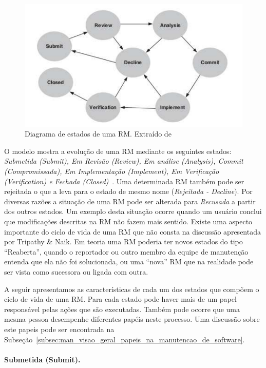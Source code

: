 \begin{figure}[htpb]
	\centering
	\includegraphics[width=0.8\linewidth]{./chapter-manutencao-software-visao-geral/img/diagrama-estado-rm.pdf}
	\caption{Diagrama de estados de uma RM\@. Extraído
		de~\cite{tripathy2014software}}
\label{fig:diagrama-estado-rm}
\end{figure}

O modelo mostra a evolução de uma RM mediante os seguintes estados:
\textit{Submetida (Submit), Em Revisão (Review), Em análise (Analysis), Commit
	(Compromissada), Em Implementação (Implement), Em Verificação (Verification)
	e Fechada (Closed)}~\cite{tripathy2014software}. Uma determinada RM também
pode ser rejeitada o que a leva para o estado de mesmo nome (\textit{Rejeitada -
	Decline}).  Por diversas razões a situação de uma RM pode ser alterada para
\textit{Recusada} a partir dos outros estados. Um exemplo desta situação ocorre
quando um  usuário conclui que modificações descritas na RM não fazem mais
sentido. Existe uma aspecto importante do ciclo de vida de uma RM que não consta
na discussão apresentada por Tripathy \& Naik. Em teoria uma RM poderia ter
novos estados do tipo ``Reaberta'', quando o reportador ou outro membro da
equipe de manutenção entenda que ela não foi solucionada, ou uma ``nova'' RM que
na realidade pode ser vista como sucessora ou ligada com outra.

A seguir apresentamos as características de cada um dos estados que compõem o
ciclo de vida de uma RM\@. Para cada estado pode haver mais de um papel
responsável pelas ações que são executadas. Também pode ocorre que uma mesma
pessoa desempenhe diferentes papéis neste processo. Uma discussão sobre este
papeis pode ser encontrada na
Subseção~\ref{subsec:man_visao_geral_papeis_na_manutencao_de_software}.

\paragraph{Submetida (Submit).}
\label{par:submetida)}

